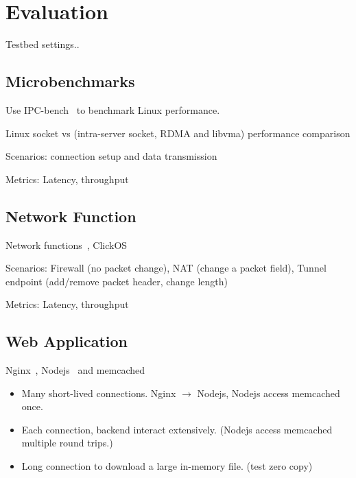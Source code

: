 \section{Evaluation}
\label{sec:evaluation}

Testbed settings..

\subsection{Microbenchmarks}

Use IPC-bench~\cite{ipc-bench} to benchmark Linux performance.

Linux socket vs \sys (intra-server socket, RDMA and libvma) performance comparison

Scenarios: connection setup and data transmission

Metrics: Latency, throughput




\subsection{Network Function}

Network functions~\cite{li2016clicknp}, ClickOS~\cite{martins2014clickos}

Scenarios: Firewall (no packet change), NAT (change a packet field), Tunnel endpoint (add/remove packet header, change length)

Metrics: Latency, throughput


\subsection{Web Application}

Nginx~\cite{nginx}, Nodejs~\cite{nodejs} and memcached~\cite{memcached}

\begin{itemize}
	\item Many short-lived connections. Nginx $\rightarrow$ Nodejs, Nodejs access memcached once.
	\item Each connection, backend interact extensively. (Nodejs access memcached multiple round trips.)
	\item Long connection to download a large in-memory file. (test zero copy)
\end{itemize}



